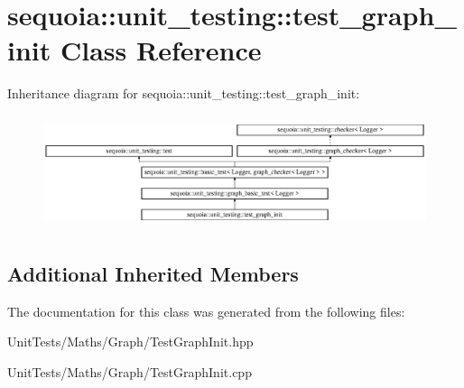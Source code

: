 \hypertarget{classsequoia_1_1unit__testing_1_1test__graph__init}{}\section{sequoia\+::unit\+\_\+testing\+::test\+\_\+graph\+\_\+init Class Reference}
\label{classsequoia_1_1unit__testing_1_1test__graph__init}
Inheritance diagram for sequoia\+::unit\+\_\+testing\+::test\+\_\+graph\+\_\+init\+:\begin{figure}[H]
\begin{center}
\leavevmode
\includegraphics[height=3.357314cm]{classsequoia_1_1unit__testing_1_1test__graph__init}
\end{center}
\end{figure}
\subsection*{Additional Inherited Members}


The documentation for this class was generated from the following files\+:\begin{DoxyCompactItemize}
\item 
Unit\+Tests/\+Maths/\+Graph/Test\+Graph\+Init.\+hpp\item 
Unit\+Tests/\+Maths/\+Graph/Test\+Graph\+Init.\+cpp\end{DoxyCompactItemize}
